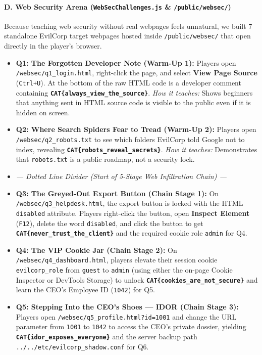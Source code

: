 \documentclass[11pt,a4paper]{article}
\begin{document}
\paragraph{D. Web Security Arena (\texttt{WebSecChallenges.js} \& \texttt{/public/websec/})}
Because teaching web security without real webpages feels unnatural, we built 7 standalone EvilCorp target webpages hosted inside \texttt{/public/websec/} that open directly in the player's browser.
\begin{itemize}
    \item \textbf{Q1: The Forgotten Developer Note (Warm-Up 1):} Players open \texttt{/websec/\allowbreak q1\_login.html}, right-click the page, and select \textbf{View Page Source} (\texttt{Ctrl+U}). At the bottom of the raw HTML code is a developer comment containing \textbf{\texttt{CAT\{always\_view\_the\_source\}}}. \textit{How it teaches:} Shows beginners that anything sent in HTML source code is visible to the public even if it is hidden on screen.
    \item \textbf{Q2: Where Search Spiders Fear to Tread (Warm-Up 2):} Players open \texttt{/websec/\allowbreak q2\_robots.txt} to see which folders EvilCorp told Google not to index, revealing \textbf{\texttt{CAT\{robots\_reveal\_secrets\}}}. \textit{How it teaches:} Demonstrates that \texttt{robots.txt} is a public roadmap, not a security lock.
    \item \textit{--- Dotted Line Divider (Start of 5-Stage Web Infiltration Chain) ---}
    \item \textbf{Q3: The Greyed-Out Export Button (Chain Stage 1):} On \texttt{/websec/\allowbreak q3\_helpdesk.html}, the export button is locked with the HTML \texttt{disabled} attribute. Players right-click the button, open \textbf{Inspect Element} (\texttt{F12}), delete the word \texttt{disabled}, and click the button to get \textbf{\texttt{CAT\{never\_trust\_the\_client\}}} and the required cookie role \texttt{admin} for Q4.
    \item \textbf{Q4: The VIP Cookie Jar (Chain Stage 2):} On \texttt{/websec/\allowbreak q4\_dashboard.html}, players elevate their session cookie \texttt{evilcorp\_role} from \texttt{guest} to \texttt{admin} (using either the on-page Cookie Inspector or DevTools Storage) to unlock \textbf{\texttt{CAT\{cookies\_are\_not\_secure\}}} and learn the CEO's Employee ID (\texttt{1042}) for Q5.
    \item \textbf{Q5: Stepping Into the CEO's Shoes --- IDOR (Chain Stage 3):} Players open \texttt{/websec/\allowbreak q5\_profile.html?id=1001} and change the URL parameter from \texttt{1001} to \texttt{1042} to access the CEO's private dossier, yielding \textbf{\texttt{CAT\{idor\_exposes\_everyone\}}} and the server backup path \texttt{../../etc/\allowbreak evilcorp\_shadow.conf} for Q6.

\end{itemize}
\end{document}
